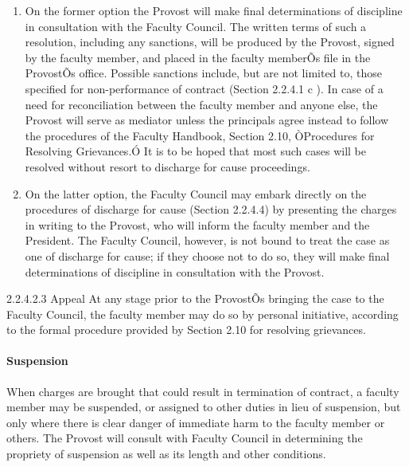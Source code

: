 \documentclass[letterpaper, 11pt]{article}
\begin{document}
\begin{enumerate}[label=\alph*)]
{						\begin{enumerate}[label=\arabic*)]
							\item{On the former option the Provost will make final determinations of discipline in consultation with the Faculty Council.  The written terms of such a resolution, including any sanctions, will be produced by the Provost, signed by the faculty member, and placed in the faculty memberÕs file in the ProvostÕs office.  Possible sanctions include, but are not limited to, those specified for non-performance of contract (Section 2.2.4.1 c ).  In case of a need for reconciliation between the faculty member and anyone else, the Provost will serve as mediator unless the principals agree instead to follow the procedures of the Faculty Handbook, Section 2.10, ÒProcedures for Resolving Grievances.Ó  It is to be hoped that most such cases will be resolved without resort to discharge for cause proceedings.}
							\item{On the latter option, the Faculty Council may embark directly on the procedures of discharge for cause (Section 2.2.4.4) by presenting the charges in writing to the Provost, who will inform the faculty member and the President.  The Faculty Council, however, is not bound to treat the case as one of discharge for cause; if they choose not to do so, they will make final determinations of discipline in consultation with the Provost.}
						\end{enumerate}
					}
				\end{enumerate}
				2.2.4.2.3 Appeal
				At any stage prior to the ProvostÕs bringing the case to the Faculty Council, the faculty member may do so by personal initiative, according to the formal procedure provided by Section 2.10 for resolving grievances.
			\paragraph{Suspension}
				When charges are brought that could result in termination of contract, a faculty member may be suspended, or assigned to other duties in lieu of suspension, but only where there is clear danger of immediate harm to the faculty member or others.  The Provost will consult with Faculty Council in determining the propriety of suspension as well as its length and other conditions.
\end{document}

